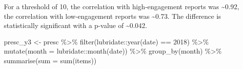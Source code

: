 \documentclass[
]{article}
\newenvironment{Shaded}{\begin{snugshade}}{\end{snugshade}}
\newcommand{\AttributeTok}[1]{\textcolor[rgb]{0.77,0.63,0.00}{#1}}
\newcommand{\DecValTok}[1]{\textcolor[rgb]{0.00,0.00,0.81}{#1}}
\newcommand{\FunctionTok}[1]{\textcolor[rgb]{0.00,0.00,0.00}{#1}}
\newcommand{\NormalTok}[1]{#1}
\newcommand{\OtherTok}[1]{\textcolor[rgb]{0.56,0.35,0.01}{#1}}
\newcommand{\SpecialCharTok}[1]{\textcolor[rgb]{0.00,0.00,0.00}{#1}}
\begin{document}
For a threshold of 10, the correlation with high-engagement reports was
\textasciitilde0.92, the correlation with low-engagement reports was
\textasciitilde0.73. The difference is statistically significant with a
p-value of \textasciitilde0.042.

\begin{Shaded}
\begin{Highlighting}[]
\NormalTok{ presc\_y3 }\OtherTok{\textless{}{-}}\NormalTok{ presc }\SpecialCharTok{\%\textgreater{}\%} 
   \FunctionTok{filter}\NormalTok{(lubridate}\SpecialCharTok{::}\FunctionTok{year}\NormalTok{(date) }\SpecialCharTok{==} \DecValTok{2018}\NormalTok{) }\SpecialCharTok{\%\textgreater{}\%}
   \FunctionTok{mutate}\NormalTok{(}\AttributeTok{month =}\NormalTok{ lubridate}\SpecialCharTok{::}\FunctionTok{month}\NormalTok{(date)) }\SpecialCharTok{\%\textgreater{}\%} 
   \FunctionTok{group\_by}\NormalTok{(month) }\SpecialCharTok{\%\textgreater{}\%} 
   \FunctionTok{summarise}\NormalTok{(}\AttributeTok{sum =} \FunctionTok{sum}\NormalTok{(items))}



\end{Highlighting}
\end{Shaded}
\end{document}
